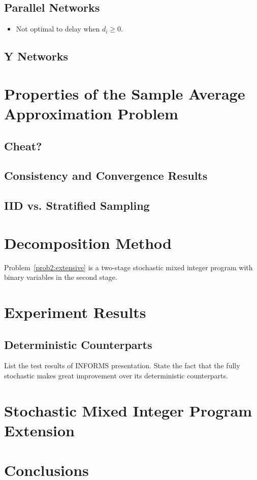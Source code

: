 \documentclass[11pt]{article}
\begin{document}
	\subsection{Parallel Networks}
		\begin{itemize}
			\item Not optimal to delay when \(d_i \geq 0\).
		\end{itemize}
	\subsection{Y Networks}
\section{Properties of the Sample Average Approximation Problem} \label{sec:consistency}
	\subsection{Cheat?}
	\subsection{Consistency and Convergence Results}
	\subsection{IID vs. Stratified Sampling}
\section{Decomposition Method} \label{sec:decomposition}
	Problem~\eqref{prob2:extensive} is a two-stage stochastic mixed integer program with binary variables in the second stage. 
\section{Experiment Results} \label{sec:results}
	\subsection{Deterministic Counterparts}
		List the test results of INFORMS presentation. State the fact that the fully stochastic makes great improvement over its deterministic counterparts.
\section{Stochastic Mixed Integer Program Extension}
\section{Conclusions} \label{sec:conclusions}



\end{document}
